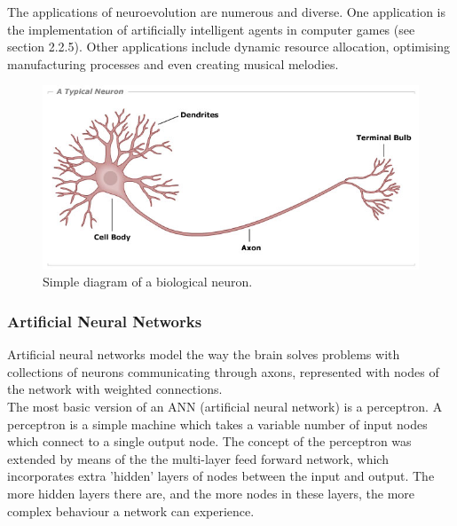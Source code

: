 \documentclass[11pt,a4paper]{article}
\begin{document}
The applications of neuroevolution are numerous and diverse. One application is the implementation of artificially intelligent agents in computer games (see section 2.2.5). Other applications include dynamic resource allocation, optimising manufacturing processes and even creating musical melodies. \cite{neapps}
\begin{figure}[h]
\includegraphics[width=\textwidth]{neuron}
\caption{Simple diagram of a biological neuron.}
\end{figure}
\newpage
\subsubsection{Artificial Neural Networks}
Artificial neural networks model the way the brain solves problems with collections of neurons communicating through axons, represented with nodes of the network with weighted connections. \\

The most basic version of an ANN (artificial neural network) is a perceptron. A perceptron is a simple machine which takes a variable number of input nodes which connect to a single output node. \cite{percept} The concept of the perceptron was extended by means of the the multi-layer feed forward network, which incorporates extra 'hidden' layers of nodes between the input and output. The more hidden layers there are, and the more nodes in these layers, the more complex behaviour a network can experience. \cite{ffann}\\
\end{document}
